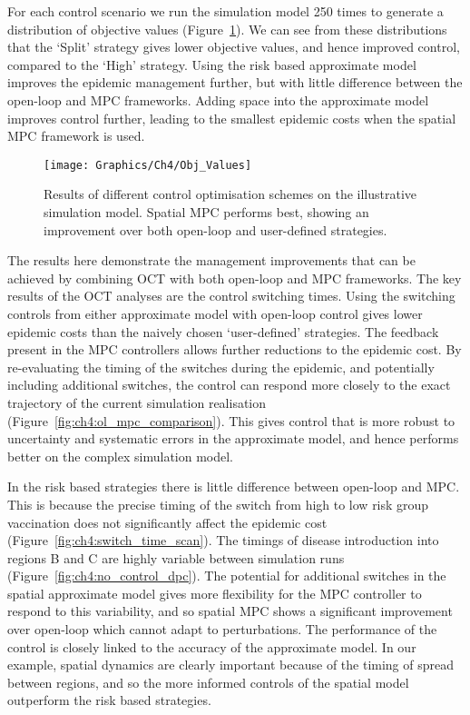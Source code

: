 For each control scenario we run the simulation model 250 times to generate a distribution of objective values (Figure~\ref{fig:ch4:obj_values}). We can see from these distributions that the `Split' strategy gives lower objective values, and hence improved control, compared to the `High' strategy. Using the risk based approximate model improves the epidemic management further, but with little difference between the open-loop and MPC frameworks. Adding space into the approximate model improves control further, leading to the smallest epidemic costs when the spatial MPC framework is used.

\begin{figure}[h]
    \begin{center}
        \texttt{[image: Graphics/Ch4/Obj\_Values]}
        \caption[Comparing control strategy performance on the network model]{Results of different control optimisation schemes on the illustrative simulation model. Spatial MPC performs best, showing an improvement over both open-loop and user-defined strategies.}
        \label{fig:ch4:obj_values}
    \end{center}
\end{figure}

The results here demonstrate the management improvements that can be achieved by combining OCT with both open-loop and MPC frameworks. The key results of the OCT analyses are the control switching times. Using the switching controls from either approximate model with open-loop control gives lower epidemic costs than the naively chosen `user-defined' strategies. The feedback present in the MPC controllers allows further reductions to the epidemic cost. By re-evaluating the timing of the switches during the epidemic, and potentially including additional switches, the control can respond more closely to the exact trajectory of the current simulation realisation (Figure~\ref{fig:ch4:ol_mpc_comparison}). This gives control that is more robust to uncertainty and systematic errors in the approximate model, and hence performs better on the complex simulation model.

In the risk based strategies there is little difference between open-loop and MPC\@. This is because the precise timing of the switch from high to low risk group vaccination does not significantly affect the epidemic cost (Figure~\ref{fig:ch4:switch_time_scan}). The timings of disease introduction into regions B and C are highly variable between simulation runs (Figure~\ref{fig:ch4:no_control_dpc}). The potential for additional switches in the spatial approximate model gives more flexibility for the MPC controller to respond to this variability, and so spatial MPC shows a significant improvement over open-loop which cannot adapt to perturbations. The performance of the control is closely linked to the accuracy of the approximate model. In our example, spatial dynamics are clearly important because of the timing of spread between regions, and so the more informed controls of the spatial model outperform the risk based strategies.

